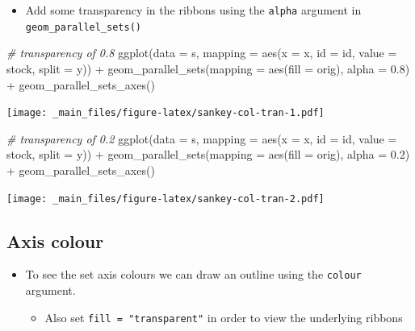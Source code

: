 \documentclass[
]{book}
\newenvironment{Shaded}{\begin{snugshade}}{\end{snugshade}}
\newcommand{\AttributeTok}[1]{\textcolor[rgb]{0.77,0.63,0.00}{#1}}
\newcommand{\CommentTok}[1]{\textcolor[rgb]{0.56,0.35,0.01}{\textit{#1}}}
\newcommand{\FloatTok}[1]{\textcolor[rgb]{0.00,0.00,0.81}{#1}}
\newcommand{\FunctionTok}[1]{\textcolor[rgb]{0.00,0.00,0.00}{#1}}
\newcommand{\NormalTok}[1]{#1}
\newcommand{\SpecialCharTok}[1]{\textcolor[rgb]{0.00,0.00,0.00}{#1}}
\providecommand{\tightlist}{%
  \setlength{\itemsep}{0pt}\setlength{\parskip}{0pt}}
\begin{document}
\begin{itemize}
\tightlist
\item
  Add some transparency in the ribbons using the \texttt{alpha} argument in \texttt{geom\_parallel\_sets()}
\end{itemize}

\begin{Shaded}
\begin{Highlighting}[]
\CommentTok{\# transparency of 0.8}
\FunctionTok{ggplot}\NormalTok{(}\AttributeTok{data =}\NormalTok{ s, }\AttributeTok{mapping =} \FunctionTok{aes}\NormalTok{(}\AttributeTok{x =}\NormalTok{ x, }\AttributeTok{id =}\NormalTok{ id, }\AttributeTok{value =}\NormalTok{ stock, }\AttributeTok{split =}\NormalTok{ y)) }\SpecialCharTok{+}
  \FunctionTok{geom\_parallel\_sets}\NormalTok{(}\AttributeTok{mapping =} \FunctionTok{aes}\NormalTok{(}\AttributeTok{fill =}\NormalTok{ orig), }\AttributeTok{alpha =} \FloatTok{0.8}\NormalTok{) }\SpecialCharTok{+}
  \FunctionTok{geom\_parallel\_sets\_axes}\NormalTok{()}
\end{Highlighting}
\end{Shaded}

\texttt{[image: \_main\_files/figure-latex/sankey-col-tran-1.pdf]}

\begin{Shaded}
\begin{Highlighting}[]
\CommentTok{\# transparency of 0.2}
\FunctionTok{ggplot}\NormalTok{(}\AttributeTok{data =}\NormalTok{ s, }\AttributeTok{mapping =} \FunctionTok{aes}\NormalTok{(}\AttributeTok{x =}\NormalTok{ x, }\AttributeTok{id =}\NormalTok{ id, }\AttributeTok{value =}\NormalTok{ stock, }\AttributeTok{split =}\NormalTok{ y)) }\SpecialCharTok{+}
  \FunctionTok{geom\_parallel\_sets}\NormalTok{(}\AttributeTok{mapping =} \FunctionTok{aes}\NormalTok{(}\AttributeTok{fill =}\NormalTok{ orig), }\AttributeTok{alpha =} \FloatTok{0.2}\NormalTok{) }\SpecialCharTok{+}
  \FunctionTok{geom\_parallel\_sets\_axes}\NormalTok{()}
\end{Highlighting}
\end{Shaded}

\texttt{[image: \_main\_files/figure-latex/sankey-col-tran-2.pdf]}

\hypertarget{axis-colour}{%
\subsection{Axis colour}\label{axis-colour}}

\begin{itemize}
\tightlist
\item
  To see the set axis colours we can draw an outline using the \texttt{colour} argument.

  \begin{itemize}
  \tightlist
  \item
    Also set \texttt{fill\ =\ "transparent"} in order to view the underlying ribbons
  \end{itemize}
\end{itemize}
\end{document}
